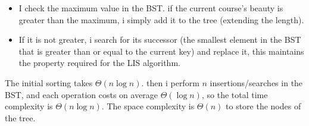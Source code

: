 \documentclass[10pt]{article}
\begin{document}
\begin{itemize}
        \begin{itemize}
            \item I check the maximum value in the BST. if the current course's beauty is greater than the maximum, i simply add it to the tree (extending the length).
            \item If it is not greater, i search for its successor (the smallest element in the BST that is greater than or equal to the current key) and replace it, this maintains the property required for the LIS algorithm.
        \end{itemize}

        The initial sorting takes $\Theta(n \log n)$. then i perform $n$ insertions/searches in the BST, and each operation costs on average $\Theta(\log n)$, so the total time complexity is $\Theta(n \log n)$. The space complexity is $\Theta(n)$ to store the nodes of the tree.

\end{itemize}
\end{document}
